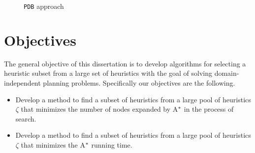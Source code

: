 \begin{figure}[htb]
\caption{\texttt{PDB} approach} \label{fig:ss_ts}
\end{figure}
\fi

\section{Objectives}
The general objective of this dissertation is to develop algorithms for selecting a heuristic subset from a large set of heuristics with the goal of solving domain-independent planning problems. Specifically our objectives are the following. 


\begin{itemize}
  \item Develop a method to find a subset of heuristics from a large pool of heuristics $\zeta$ that minimizes the number of nodes expanded by A$\sp{*}$ in the process of search.
  
  \item Develop a method to find a subset of heuristics from a large pool of heuristics $\zeta$ that minimizes the A$\sp{*}$ running time.

\end{itemize}
